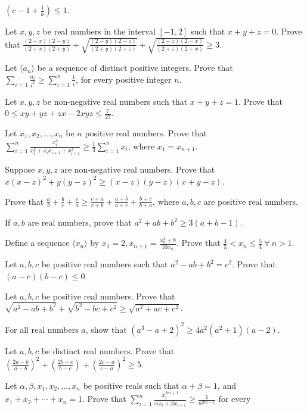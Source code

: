   $\left(c - 1 + \frac{1}{a}\right)\leq 1$.
\item Let $x, y, z$ be real numbers in the interval $[-1, 2]$ such that $x + y + z = 0$. Prove that $\frac{(2 - x)(2 - y)}{(2 +
  x)(2 + y)} + \sqrt{\frac{(2 - y)(2 - z)}{(2 + y)(2 + z)}} + \sqrt{\frac{(2 - z)(2 - x)}{(2 + z)(2 + x)}}\geq 3$.
\item Let $\langle a_n\rangle$ be a sequence of distinct positive integers. Prove that $\displaystyle\sum_{i=1}\frac{a_i}{i^2}\geq
  \sum_{i = 1}^n\frac{1}{i}$, for every positive integer $n$.
\item Let $x, y, z$ be non-negative real numbers such that $x + y + z = 1$. Prove that $0\leq xy + yz + zx - 2xyz\leq
  \frac{7}{27}$.
\item Let $x_1, x_2, \ldots, x_n$ be $n$ positive real numbers. Prove that $\displaystyle\sum_{i=1}^n\frac{x_i^3}{x_i^2 + x_ix_{i +
    1} + x_{i + 1}^2}\geq \frac{1}{3}\sum_{i=1}^nx_i$, where $x_1 = x_{n + 1}$.
\item Suppose $x, y, z$ are non-negative real numbers. Prove that $x(x - z)^2 + y(y - z)^2\geq (x - z)(y - z)(x + y - z)$.
\item Prove that $\frac{a}{b} + \frac{b}{c} + \frac{c}{a}\geq \frac{c + a}{c + b} + \frac{a + b}{a + c} + \frac{b + c}{b + a}$,
  where $a, b, c$ are positive real numbers.
\item If $a, b$ are real numbers, prove that $a^2 + ab + b^2\geq 3(a + b - 1)$.
\item Define a sequence $\langle x_n\rangle$ by $x_1 = 2, x_{n + 1} = \frac{x_n^4 + 9}{10x_n}$. Prove that $\frac{4}{5}< x_n \leq
  \frac{5}{4}~\forall~n > 1$.
\item Let $a, b, c$ be positive real numbers such that $a^2 - ab + b^2 = c^2$. Prove that $(a - c)(b - c)\leq 0$.
\item Let $a, b, c$ be positive real numbers. Prove that $\sqrt{a^2 - ab + b^2} + \sqrt{b^2 - bc + c^2}\geq \sqrt{a^2 + ac + c^2}$.
\item For all real numbers $a$, show that $(a^3 - a + 2)^2 \geq 4a^2(a^2 + 1)(a - 2)$.
\item Let $a, b, c$ be distinct real numbers. Prove that $\left(\frac{2a - b}{a - b}\right)^2 + \left(\frac{2b - c}{b -c}\right) +
  \left(\frac{2c - a}{c - a}\right)^2\geq 5$.
\item Let $\alpha, \beta, x_1, x_2, \ldots, x_n$ be positive reals such that $\alpha + \beta = 1$, and $x_1 + x_2 + \cdots + x_n =
  1$. Prove that $\displaystyle\sum_{i=1}^n\frac{x_i^{2m + 1}}{\alpha x_i + \beta x_{i + 1}}\geq \frac{1}{n^{2m - 1}}$ for every
